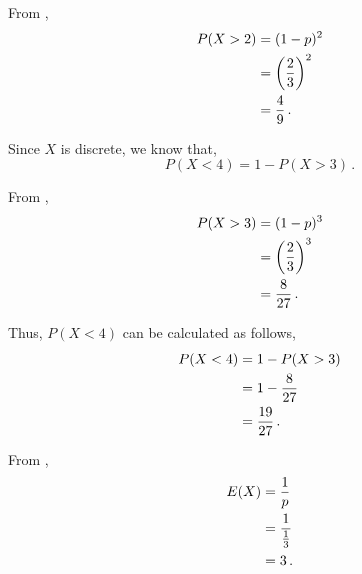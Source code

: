 \begin{subquestions}
\begin{subsubquestions}
\begin{subsubsubquestions}

\subsubsubquestion

From ,
\begin{align}
	P(X > 2) & = (1-p)^2 \nonumber \\
	            & = \left(\frac{2}{3}\right)^2 \nonumber \\
	            & = \frac{4}{9} \,.
\end{align}


\subsubsubquestion

Since $X$ is discrete, we know that,
\begin{equation}
	P(X < 4) = 1 - P(X > 3) \,.
\end{equation}

From ,
\begin{align}
	P(X > 3) & = (1-p)^3 \nonumber \\
		   	 & = \left(\frac{2}{3}\right)^3 \nonumber \\
			 & = \frac{8}{27} \,.
\end{align}

Thus, $P(X<4)$ can be calculated as follows,
\begin{align}
	P(X < 4) & = 1 - P(X > 3) \nonumber \\
	         & = 1 - \frac{8}{27} \nonumber \\
	         & = \frac{19}{27} \,.
\end{align}

\end{subsubsubquestions}


\subsubquestion

From ,
\begin{align}
	E(X) & = \frac{1}{p} \nonumber \\
	     & = \frac{1}{\frac{1}{3}} \nonumber \\
	     & = 3 \,.
\end{align}


\end{subsubquestions}

\end{subquestions}
